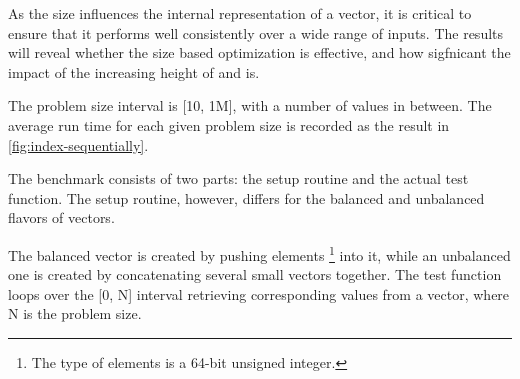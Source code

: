 As the size influences the internal representation of a vector, it is critical to ensure that it performs well consistently over a wide range of inputs. The results will reveal whether the size based optimization is effective, and how sigfnicant the impact of the increasing height of \rbtree{} and \rrbtree{} is. 

The problem size interval is [10, 1M], with a number of values in between. The average run time for each given problem size is recorded as the result in \ref{fig:index-sequentially}. 

The benchmark consists of two parts: the setup routine and the actual test function. The setup routine, however, differs for the balanced and unbalanced flavors of vectors. 

The balanced vector is created by pushing elements \footnote{The type of elements is a 64-bit unsigned integer.} into it, while an unbalanced one is created by concatenating several small vectors together. The test function loops over the [0, N] interval retrieving corresponding values from a vector, where N  is the problem size. 

